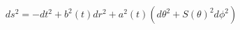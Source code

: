 \begin{equation}\label{metric}
ds^2=-dt^2+b^2(t)dr^2+a^2(t)(d\theta^2+S(\theta)^2d\phi^2)
\end{equation}

